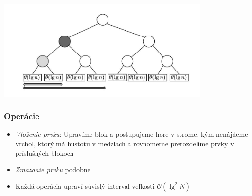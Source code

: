 \documentclass{beamer}
\newcommand{\bigO}{\ensuremath{\mathcal{O}}}
\begin{document}
\begin{frame}
\begin{center}
        \includegraphics[width=0.8\textwidth,]{../figures/downloaded_dont_use/fig2-ofm.jpg}
    \end{center}
\end{frame}

\begin{frame}
    \frametitle{Operácie}
    \begin{itemize}
        \item {\em Vloženie prvku}: Upravíme blok a postupujeme hore v strome, kým nenájdeme vrchol, ktorý má hustotu v medziach a rovnomerne prerozdelíme prvky v príslušných blokoch
        \item {\em Zmazanie prvku} podobne
        \item Každá operácia upraví súvislý interval veľkosti $\bigO(\lg^2 N)$
    \end{itemize}
\end{frame}
\end{document}
